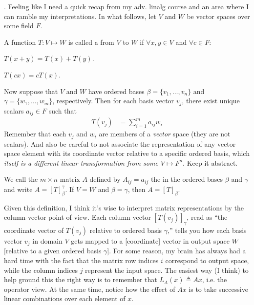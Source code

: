 \documentclass[11pt]{article}
\newcommand\p{\Needspace{10\baselineskip} \noindent}
\begin{document}
\p {}. Feeling like I need a quick recap from my adv. linalg course and an area where I can ramble my interpretations. In what follows, let $V$ and $W$ be vector spaces over some field $F$.

\begin{definition}
	A function $T: V \mapsto W$ is called a  from $V$ to $W$ if $\forall x,y \in V$ and $\forall c \in F$:
	\begin{compactitem}
		\item $T(x + y) = T(x) + T(y)$. 
		\item $T(cx) = cT(x)$. 
	\end{compactitem}
\end{definition}
Now suppose that $V$ and $W$ have ordered bases $\beta = \{v_1, \ldots, v_n\}$ and $\gamma = \{w_1, \ldots, w_m\}$, respectively. Then for each basis vector $v_j$, there exist unique scalars $a_{ij} \in F$ such that
\begin{align}
	T(v_j) &= \sum_{i=1}^m a_{ij} w_i 
\end{align} 
Remember that each $v_j$ and $w_i$ are members of a \textit{vector} space (they are not scalars). And also be careful to not associate the representation of any vector space element with its coordinate vector relative to a specific ordered basis, which \textit{itself is a different linear transformation from some $V \mapsto F^n$}. Keep it abstract.

\begin{definition}
	We call the $m \times n$ matrix $A$ defined by $A_{ij} = a_{ij}$ the  in the ordered bases $\beta$ and $\gamma$ and write $A = [T]_{\beta}^{\gamma}$. If $V = W$ and $\beta = \gamma$, then $A =  [T]_{\beta}$. 
\end{definition}
Given this definition, I think it's wise to interpret matrix representations by the column-vector point of view. Each column vector $[T(v_j)]_{\gamma}$, read as ``the coordinate vector of $T(v_j)$ relative to ordered basis $\gamma$,'' tells you how each basis vector $v_j$ in domain $V$ gets mapped to a [coordinate] vector in output space $W$ [relative to a given ordered basis $\gamma$]. For some reason, my brain has always had a hard time with the fact that the matrix row indices $i$ correspond to output space, while the column indices $j$ represent the input space. The easiest way (I think) to help ground this the right way is to remember that $L_A(x) \triangleq A x$, i.e. the operator view. At the same time, notice how the effect of $Ax$ is to take successive linear combinations over each element of $x$. \\
\end{document}
